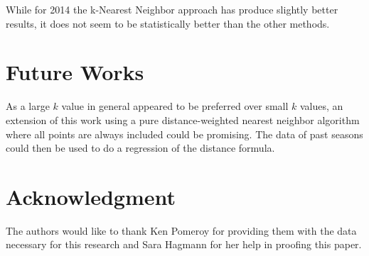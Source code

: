 \documentclass[5p, preprint]{elsarticle}
\begin{document}
While for 2014 the k-Nearest Neighbor approach has produce slightly better results, it does not seem to be statistically better than the other methods.



\section{Future Works}

As a large $k$ value in general appeared to be preferred over small $k$ values, an extension of this work using a pure distance-weighted nearest neighbor algorithm where all points are always included could be promising. The data of past seasons could then be used to do a regression of the distance formula. 


\section*{Acknowledgment}


The authors would like to thank Ken Pomeroy for providing them with the data necessary for this research and Sara Hagmann for her help in proofing this paper.
\end{document}
